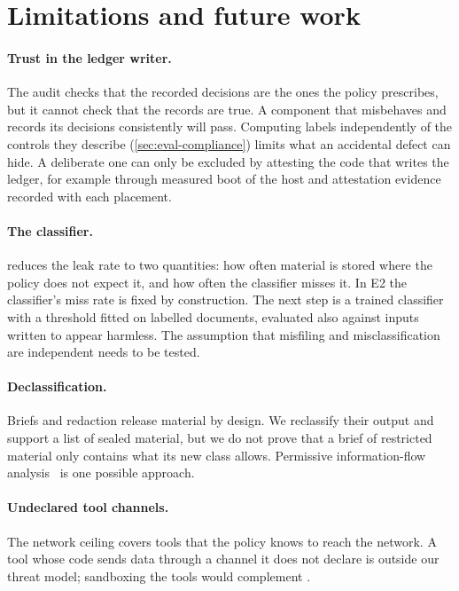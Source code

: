 \section{Limitations and future work}
\label{sec:discussion}

\paragraph{Trust in the ledger writer.} The audit checks that the recorded decisions are the
ones the policy prescribes, but it cannot check that the records are true. A component that
misbehaves and records its decisions consistently will pass. Computing labels independently of
the controls they describe (\cref{sec:eval-compliance}) limits what an accidental defect can
hide. A deliberate one can only be excluded by attesting the code that writes the ledger, for
example through measured boot of the host and attestation evidence recorded with each placement.

\paragraph{The classifier.}  reduces the leak rate to two quantities: how often
material is stored where the policy does not expect it, and how often the classifier misses
it. In E2 the classifier's miss rate is fixed by construction. The next step is a trained
classifier with a threshold fitted on labelled documents, evaluated also against inputs written
to appear harmless. The assumption that misfiling and misclassification are independent needs
to be tested.

\paragraph{Declassification.} Briefs and redaction release material by design. We reclassify
their output and support a list of sealed material, but we do not prove that a brief of
restricted material only contains what its new class allows. Permissive information-flow
analysis~\citep{siddiqui2024permissive} is one possible approach.

\paragraph{Undeclared tool channels.} The network ceiling covers tools that the policy knows
to reach the network. A tool whose code sends data through a channel it does not declare is
outside our threat model; sandboxing the tools would complement \annona.

